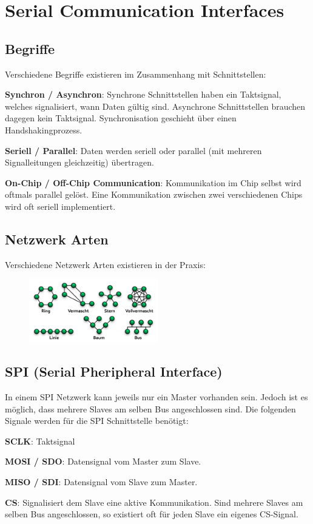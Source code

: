 \section{Serial Communication Interfaces}
\subsection{Begriffe}
Verschiedene Begriffe existieren im Zusammenhang mit Schnittstellen:
\begin{compactitem}
    \item \textbf{Synchron / Asynchron}: Synchrone Schnittstellen haben ein Taktsignal, welches signalisiert, wann Daten gültig sind. Asynchrone Schnittstellen brauchen dagegen kein Taktsignal. Synchronisation geschieht über einen Handshakingprozess.
    \item \textbf{Seriell / Parallel}: Daten werden seriell oder parallel (mit mehreren Signalleitungen gleichzeitig) übertragen.
    \item \textbf{On-Chip / Off-Chip Communication}: Kommunikation im Chip selbst wird oftmals parallel gelöst. Eine Kommunikation zwischen zwei verschiedenen Chips wird oft seriell implementiert.
\end{compactitem}

\begin{multicols}{2}
    \subsection{Netzwerk Arten}
    Verschiedene Netzwerk Arten existieren in der Praxis:
    \begin{figure}[H]
        \includegraphics[width=0.5\textwidth]{images/netzwerkarten.png}
    \end{figure}

    \subsection{SPI (Serial Pheripheral Interface)}
    In einem SPI Netzwerk kann jeweils nur ein Master vorhanden sein. Jedoch ist es möglich, dass mehrere Slaves am selben Bus angeschlossen sind. Die folgenden Signale werden für die SPI Schnittstelle benötigt:
    \begin{compactitem}
        \item \textbf{SCLK}: Taktsignal
        \item \textbf{MOSI / SDO}: Datensignal vom Master zum Slave.
        \item \textbf{MISO / SDI}: Datensignal vom Slave zum Master.
        \item \textbf{CS}: Signalisiert dem Slave eine aktive Kommunikation. Sind mehrere Slaves am selben Bus angeschlossen, so existiert oft für jeden Slave ein eigenes CS-Signal.
    \end{compactitem}
\end{multicols}

